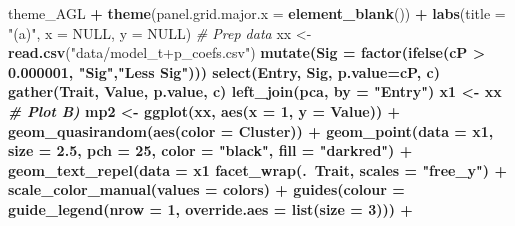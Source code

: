 \documentclass[
]{article}
\newenvironment{Shaded}{\begin{snugshade}}{\end{snugshade}}
\newcommand{\CommentTok}[1]{\textcolor[rgb]{0.56,0.35,0.01}{\textit{#1}}}
\newcommand{\DataTypeTok}[1]{\textcolor[rgb]{0.13,0.29,0.53}{#1}}
\newcommand{\DecValTok}[1]{\textcolor[rgb]{0.00,0.00,0.81}{#1}}
\newcommand{\FloatTok}[1]{\textcolor[rgb]{0.00,0.00,0.81}{#1}}
\newcommand{\KeywordTok}[1]{\textcolor[rgb]{0.13,0.29,0.53}{\textbf{#1}}}
\newcommand{\NormalTok}[1]{#1}
\newcommand{\OperatorTok}[1]{\textcolor[rgb]{0.81,0.36,0.00}{\textbf{#1}}}
\newcommand{\OtherTok}[1]{\textcolor[rgb]{0.56,0.35,0.01}{#1}}
\newcommand{\StringTok}[1]{\textcolor[rgb]{0.31,0.60,0.02}{#1}}
\begin{document}
\begin{Shaded}
\begin{Highlighting}[]
{{{{{{\StringTok{  }\NormalTok{theme_AGL }\OperatorTok{+}
\StringTok{  }\KeywordTok{theme}\NormalTok{(}\DataTypeTok{panel.grid.major.x =} \KeywordTok{element_blank}\NormalTok{()) }\OperatorTok{+}
\StringTok{  }\KeywordTok{labs}\NormalTok{(}\DataTypeTok{title =} \StringTok{"(a)"}\NormalTok{, }\DataTypeTok{x =} \OtherTok{NULL}\NormalTok{, }\DataTypeTok{y =} \OtherTok{NULL}\NormalTok{)}
\CommentTok{# Prep data}
\NormalTok{xx <-}\StringTok{ }\KeywordTok{read.csv}\NormalTok{(}\StringTok{"data/model_t+p_coefs.csv"}\NormalTok{) }\OperatorTok{%
\StringTok{  }\KeywordTok{mutate}\NormalTok{(}\DataTypeTok{Sig =} \KeywordTok{factor}\NormalTok{(}\KeywordTok{ifelse}\NormalTok{(cP }\OperatorTok{>}\StringTok{ }\FloatTok{0.000001}\NormalTok{, }\StringTok{"Sig"}\NormalTok{,}\StringTok{"Less Sig"}\NormalTok{))) }\OperatorTok{%
\StringTok{  }\KeywordTok{select}\NormalTok{(Entry, Sig, }\DataTypeTok{p.value=}\NormalTok{cP, c) }\OperatorTok{%
\StringTok{  }\KeywordTok{gather}\NormalTok{(Trait, Value, p.value, c) }\OperatorTok{%
\StringTok{  }\KeywordTok{left_join}\NormalTok{(pca, }\DataTypeTok{by =} \StringTok{"Entry"}\NormalTok{)}
\NormalTok{x1 <-}\StringTok{ }\NormalTok{xx }\OperatorTok{%
\CommentTok{# Plot B)}
\NormalTok{mp2 <-}\StringTok{ }\KeywordTok{ggplot}\NormalTok{(xx, }\KeywordTok{aes}\NormalTok{(}\DataTypeTok{x =} \DecValTok{1}\NormalTok{, }\DataTypeTok{y =}\NormalTok{ Value)) }\OperatorTok{+}
\StringTok{  }\KeywordTok{geom_quasirandom}\NormalTok{(}\KeywordTok{aes}\NormalTok{(}\DataTypeTok{color =}\NormalTok{ Cluster)) }\OperatorTok{+}
\StringTok{  }\KeywordTok{geom_point}\NormalTok{(}\DataTypeTok{data =}\NormalTok{ x1, }\DataTypeTok{size =} \FloatTok{2.5}\NormalTok{, }\DataTypeTok{pch =} \DecValTok{25}\NormalTok{, }\DataTypeTok{color =} \StringTok{"black"}\NormalTok{, }\DataTypeTok{fill =} \StringTok{"darkred"}\NormalTok{) }\OperatorTok{+}
\StringTok{  }\KeywordTok{geom_text_repel}\NormalTok{(}\DataTypeTok{data =}\NormalTok{ x1 }\OperatorTok{%
\StringTok{  }\KeywordTok{facet_wrap}\NormalTok{(.}\OperatorTok{~}\NormalTok{Trait, }\DataTypeTok{scales =} \StringTok{"free_y"}\NormalTok{) }\OperatorTok{+}
\StringTok{  }\KeywordTok{scale_color_manual}\NormalTok{(}\DataTypeTok{values =}\NormalTok{ colors) }\OperatorTok{+}
\StringTok{  }\KeywordTok{guides}\NormalTok{(}\DataTypeTok{colour =} \KeywordTok{guide_legend}\NormalTok{(}\DataTypeTok{nrow =} \DecValTok{1}\NormalTok{, }\DataTypeTok{override.aes =} \KeywordTok{list}\NormalTok{(}\DataTypeTok{size =} \DecValTok{3}\NormalTok{))) }\OperatorTok{+}
}}}}}}}}}}}}
\end{Highlighting}
\end{Shaded}
\end{document}
